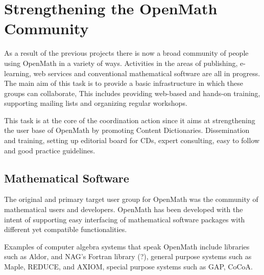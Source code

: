 \documentclass[draft]{artikel3}
\begin{document}
\section{Strengthening the OpenMath Community} 
\label{community}


As a result of the previous projects there is now a broad community of
people using OpenMath in a variety of ways.  Activities in the areas
of publishing, e-learning, web services and conventional mathematical
software are all in progress.  The main aim of this task is to provide
a basic infrastructure in which these groups can collaborate, This
includes providing web-based and hands-on training, supporting mailing
lists and organizing regular workshops.

This task is at the core of the coordination action since it aims at
strengthening the user base of OpenMath by promoting Content
Dictionaries. Dissemination and training, setting up editorial board
for CDs, expert consulting, easy to follow and good practice
guidelines.





\subsection{Mathematical Software}
\label{sec:msw}

The original and primary target user group for OpenMath was the
community of mathematical users and developers. OpenMath has been
developed with the intent of supporting easy interfacing of
mathematical software packages with different yet compatible
functionalities. 

Examples of computer algebra systems that speak OpenMath include
libraries such as Aldor, and NAG's Fortran library (?), general
purpose systems such as Maple, REDUCE, and AXIOM, special purpose
systems such as GAP, CoCoA. 
\end{document}
